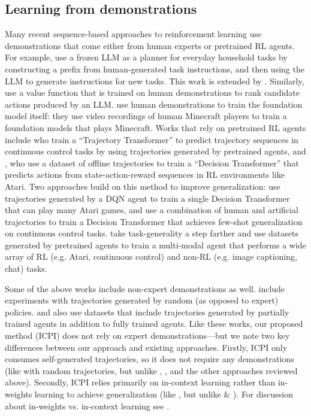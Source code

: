 \documentclass{article}
\begin{document}
\subsection{Learning from demonstrations}
Many recent sequence-based approaches to reinforcement learning use
demonstrations that come either from human experts or pretrained RL agents. For
example, \cite{huang_language_2022} use a frozen LLM as a planner for everyday
household tasks by constructing a prefix from human-generated task instructions,
and then using the LLM to generate instructions for new tasks. This work
is extended by \cite{huang_inner_2022}. Similarly,
\cite{ahn_as_2022} use a value function that is trained on human
demonstrations to rank candidate actions produced by an LLM.
\cite{baker_video_2022} use human demonstrations to train the foundation model
itself: they use video recordings of human Minecraft players to train a
foundation models that plays Minecraft. Works that rely on pretrained RL agents
include \cite{janner_offline_2021} who train a ``Trajectory Transformer'' to
predict trajectory sequences in continuous control tasks by using trajectories
generated by pretrained agents, and \cite{chen_decision_2021}, who use a
dataset of offline trajectories to train a ``Decision Transformer'' that
predicts actions from state-action-reward sequences in RL environments like
Atari. Two approaches build on this method to improve generalization:
\cite{lee_multi-game_2022} use trajectories generated by a DQN agent to train a
single Decision Transformer that can play many Atari games, and
\cite{xu_prompting_2022} use a combination of human and artificial trajectories
to train a Decision Transformer that achieves few-shot generalization on
continuous control tasks. \cite{reed_generalist_2022} take task-generality a
step farther and use datasets generated by pretrained agents to train a
multi-modal agent that performs a wide array of RL (e.g. Atari, continuous
control) and non-RL (e.g. image captioning, chat) tasks.

Some of the above works include non-expert demonstrations as well.
\cite{chen_decision_2021} include experiments with trajectories generated by
random (as opposed to expert) policies. \cite{lee_multi-game_2022} and
\cite{xu_prompting_2022} also use datasets that include trajectories generated
by partially trained agents in addition to fully trained agents. Like these
works, our proposed method (ICPI) does not rely on expert demonstrations---but
we note two key differences between our approach and existing approaches.
Firstly, ICPI only consumes self-generated trajectories, so it does not require
any demonstrations (like \cite{chen_decision_2021} with random trajectories,
but unlike \cite{lee_multi-game_2022}, \cite{xu_prompting_2022}, and the other
approaches reviewed above). Secondly, ICPI relies primarily on in-context
learning rather than in-weights learning to achieve generalization (like
\cite{xu_prompting_2022}, but unlike \cite{chen_decision_2021} \&
\cite{lee_multi-game_2022}). For discussion about in-weights vs. in-context
learning see \cite{chan_data_2022}.
\end{document}
